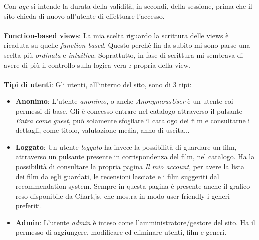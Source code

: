 \documentclass[12pt]{article}
\begin{document}
	\noindent Con \textit{age} si intende la durata della validità, in secondi, della sessione, prima che il sito chieda di nuovo all'utente di effettuare l'accesso. \\ \\
	
	\noindent \textbf{Function-based views}: La mia scelta riguardo la scrittura delle views è ricaduta su quelle \textit{function-based}. Questo perchè fin da subito mi sono parse una scelta più \textit{ordinata} e \textit{intuitiva}. Soprattutto, in fase di scrittura mi sembrava di avere di più il controllo sulla logica vera e propria della view. \\ \\
	
	\noindent \textbf{Tipi di utenti}: Gli utenti, all'interno del sito, sono di 3 tipi:
	\begin{itemize}
		\item \textbf{Anonimo}: L'utente \textit{anonimo}, o anche \textit{AnonymousUser} è un utente coi permessi di base. Gli è concesso entrare nel catalogo attraverso il pulsante \textit{Entra come guest}, può solamente sfogliare il catalogo dei film e consultarne i dettagli, come titolo, valutazione media, anno di uscita...
		 
		\item \textbf{Loggato}: Un utente \textit{loggato} ha invece la possibilità di guardare un film, attraverso un pulsante presente in corrispondenza del film, nel catalogo. Ha la possibilità di consultare la propria pagina \textit{Il mio account}, per avere la lista dei film da egli guardati, le recensioni lasciate e i film suggeriti dal recommendation system. Sempre in questa pagina è presente anche il grafico reso disponibile da Chart.js, che mostra in modo user-friendly i generi preferiti.
		\item \textbf{Admin}: L'utente \textit{admin} è inteso come l'amministratore/gestore del sito. Ha il permesso di aggiungere, modificare ed eliminare utenti, film e generi. \\
	\end{itemize}
\end{document}
